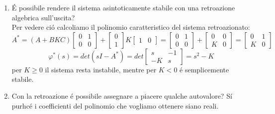 \documentclass[../main.tex]{subfiles}
\begin{document}
\begin{Exercise}[title={Retroazione algebrica sull'uscita}, difficulty=1]
\begin{enumerate}
				\item 
					\'E possibile rendere il sistema asintoticamente stabile con una retroazione algebrica sull'uscita?\\
					Per vedere ci\'o calcoliamo il polinomio caratteristico del sistema retroazionato:
					\[
						A^{*}=(A+BKC)
						\begin{bmatrix}
							0 & 1\\
							0 & 0
						\end{bmatrix} +
						\begin{bmatrix}
							0\\
							1
						\end{bmatrix} K
						\begin{bmatrix}
							1 & 0
						\end{bmatrix} =
						\begin{bmatrix}
							0 & 1\\
							0 & 0
						\end{bmatrix} +
						\begin{bmatrix}
							0 & 0\\
							K & 0
						\end{bmatrix} =
						\begin{bmatrix}
							0 & 1\\
							K & 0
						\end{bmatrix}
					\]
					\[
						\varphi^{*}(s) = det(sI-A^{*}) = det
						\begin{bmatrix}
							s & -1\\
							-K & s
						\end{bmatrix} = s^2 - K
					\]
					per $ K \geq 0 $ il sistema resta instabile, mentre per $ K < 0 $ \'e semplicemente stabile.
				\item 
					Con la retroazione \'e possibile assegnare a piacere qualche autovalore?
					S\'i purhc\'e i coefficienti del polinomio che vogliamo ottenere siano reali.
			\end{enumerate}
		\end{Exercise}
	
\end{document}
